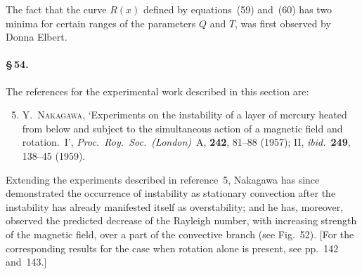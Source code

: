 The fact that the curve $R(x)$ defined by equations~(59) and~(60) has two minima
for certain ranges of the parameters $Q$ and $T$, was first observed by Donna Elbert.

\paragraph{\S\,54.} The references for the experimental work described in this section are:
\begin{enumerate}\setcounter{enumi}{4}
\item Y.~\textsc{Nakagawa}, `Experiments on the instability of a layer of mercury
heated from below and subject to the simultaneous action of a magnetic
field and rotation.~I', \textit{Proc.\ Roy.\ Soc.\ (London)}~A, \textbf{242}, 81--88 (1957);
II, \textit{ibid.}\ \textbf{249}, 138--45 (1959).
\end{enumerate}

Extending the experiments described in reference~5, Nakagawa has since demonstrated the occurrence of instability as stationary convection after the instability
has already manifested itself as overstability; and he has, moreover, observed
the predicted decrease of the Rayleigh number, with increasing strength of the
magnetic field, over a part of the convective branch (see Fig.~52). [For the corresponding results for the case when rotation alone is present, see pp.~142 and~143.]
